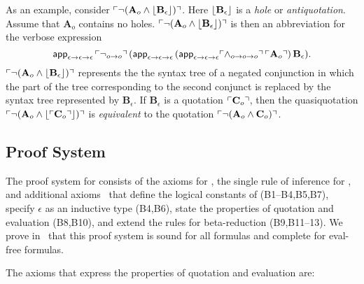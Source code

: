 \documentclass[fleqn]{llncs}
\begin{document}
As an example, consider $\ulcorner\neg(\textbf{A}_o \wedge
  \lfloor\textbf{B}_\epsilon\rfloor)\urcorner$. Here $\lfloor\textbf{B}_\epsilon\rfloor$
is a \emph{hole} or \emph{antiquotation}. Assume that
$\textbf{A}_o$ contains no holes.  $\ulcorner\neg(\textbf{A}_o \wedge
  \lfloor\textbf{B}_\epsilon\rfloor)\urcorner$ is then an abbreviation for the
verbose expression
\[\mbox{\sf app}_{\epsilon \rightarrow
  \epsilon \rightarrow \epsilon} \, \ulcorner\neg_{o \rightarrow o}\urcorner \,
(\mbox{\sf app}_{\epsilon \rightarrow \epsilon \rightarrow \epsilon} \,
(\mbox{\sf app}_{\epsilon \rightarrow \epsilon \rightarrow \epsilon}
\ulcorner\wedge_{o \rightarrow o \rightarrow o}\urcorner \, \ulcorner\textbf{A}_o\urcorner)
\, \textbf{B}_\epsilon).\] $\ulcorner\neg(\textbf{A}_o \wedge
  \lfloor\textbf{B}_\epsilon\rfloor)\urcorner$ represents the the syntax tree
of a negated conjunction in which the part of the tree corresponding
to the second conjunct is replaced by the syntax tree represented by
$\textbf{B}_\epsilon$.  If $\textbf{B}_\epsilon$ is a quotation
$\ulcorner\textbf{C}_o\urcorner$, then the quasiquotation
$\ulcorner\neg(\textbf{A}_o \wedge
  \lfloor\ulcorner\textbf{C}_o\urcorner\rfloor)\urcorner$ is \emph{equivalent} to the
quotation $\ulcorner\neg(\textbf{A}_o \wedge \textbf{C}_o)\urcorner$.

\subsection{Proof System}\label{subsec:cttqe-proof-system}

The proof system for {\churchqe} consists of the axioms for {\qzero},
the single rule of inference for {\qzero}, and additional
axioms~\cite[B1--B13]{Farmer18} that define the logical constants
of {\churchqe} (B1--B4,B5,B7), specify $\epsilon$ as an inductive type
(B4,B6), state the properties of quotation and evaluation (B8,B10),
and extend the rules for beta-reduction (B9,B11--13).  We prove
in~\cite{Farmer18} that this proof system is sound for all
formulas and complete for eval-free formulas.

The axioms that express the properties of quotation and evaluation are:

\medskip
\end{document}

